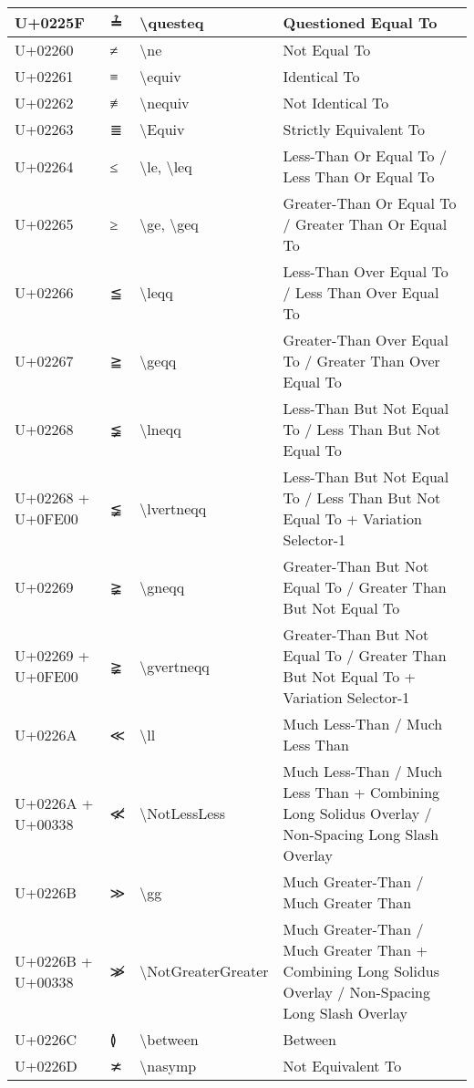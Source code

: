 \begin{table}[h]
\begin{tabulary}{\linewidth}{|L|L|L|L|}
\hline
U+0225F & ≟ & {\textbackslash}questeq & Questioned Equal To \\
\hline
U+02260 & ≠ & {\textbackslash}ne & Not Equal To \\
\hline
U+02261 & ≡ & {\textbackslash}equiv & Identical To \\
\hline
U+02262 & ≢ & {\textbackslash}nequiv & Not Identical To \\
\hline
U+02263 & ≣ & {\textbackslash}Equiv & Strictly Equivalent To \\
\hline
U+02264 & ≤ & {\textbackslash}le, {\textbackslash}leq & Less-Than Or Equal To / Less Than Or Equal To \\
\hline
U+02265 & ≥ & {\textbackslash}ge, {\textbackslash}geq & Greater-Than Or Equal To / Greater Than Or Equal To \\
\hline
U+02266 & ≦ & {\textbackslash}leqq & Less-Than Over Equal To / Less Than Over Equal To \\
\hline
U+02267 & ≧ & {\textbackslash}geqq & Greater-Than Over Equal To / Greater Than Over Equal To \\
\hline
U+02268 & ≨ & {\textbackslash}lneqq & Less-Than But Not Equal To / Less Than But Not Equal To \\
\hline
U+02268 + U+0FE00 & ≨︀ & {\textbackslash}lvertneqq & Less-Than But Not Equal To / Less Than But Not Equal To + Variation Selector-1 \\
\hline
U+02269 & ≩ & {\textbackslash}gneqq & Greater-Than But Not Equal To / Greater Than But Not Equal To \\
\hline
U+02269 + U+0FE00 & ≩︀ & {\textbackslash}gvertneqq & Greater-Than But Not Equal To / Greater Than But Not Equal To + Variation Selector-1 \\
\hline
U+0226A & ≪ & {\textbackslash}ll & Much Less-Than / Much Less Than \\
\hline
U+0226A + U+00338 & ≪̸ & {\textbackslash}NotLessLess & Much Less-Than / Much Less Than + Combining Long Solidus Overlay / Non-Spacing Long Slash Overlay \\
\hline
U+0226B & ≫ & {\textbackslash}gg & Much Greater-Than / Much Greater Than \\
\hline
U+0226B + U+00338 & ≫̸ & {\textbackslash}NotGreaterGreater & Much Greater-Than / Much Greater Than + Combining Long Solidus Overlay / Non-Spacing Long Slash Overlay \\
\hline
U+0226C & ≬ & {\textbackslash}between & Between \\
\hline
U+0226D & ≭ & {\textbackslash}nasymp & Not Equivalent To \\

\end{tabulary}
\end{table}
